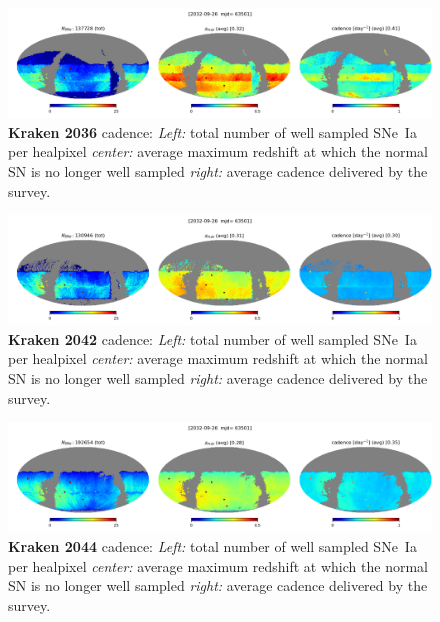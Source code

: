 \begin{figure}[h!]
  \begin{center}
    \includegraphics[width=\linewidth]{Figures/kraken_2036_64_maps.png}
    \caption{{\bf Kraken 2036} cadence: {\em Left:} total number of well
      sampled SNe~Ia per healpixel {\em center:} average maximum
      redshift at which the normal SN is no longer well sampled {\em
        right:} average cadence delivered by the survey.}
  \end{center}
\end{figure}

\begin{figure}[h!]
  \begin{center}
    \includegraphics[width=\linewidth]{Figures/kraken_2042_64_maps.png}
    \caption{{\bf Kraken 2042} cadence: {\em Left:} total number of well
      sampled SNe~Ia per healpixel {\em center:} average maximum
      redshift at which the normal SN is no longer well sampled {\em
        right:} average cadence delivered by the survey.}
  \end{center}
\end{figure}

\begin{figure}[h!]
  \begin{center}
    \includegraphics[width=\linewidth]{Figures/kraken_2044_64_maps.png}
    \caption{{\bf Kraken 2044} cadence: {\em Left:} total number of well
      sampled SNe~Ia per healpixel {\em center:} average maximum
      redshift at which the normal SN is no longer well sampled {\em
        right:} average cadence delivered by the survey.}
  \end{center}
\end{figure}

